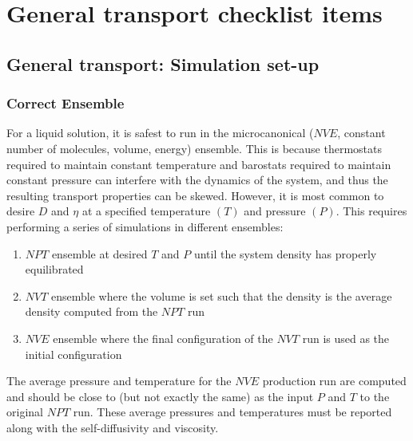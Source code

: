 \documentclass[9pt,bestpractices]{livecoms}
\begin{document}
\section{General transport checklist items} \label{sec:General}

\subsection{General transport: Simulation set-up} \label{sec:General Simulation Setup}

\subsubsection{Correct Ensemble} \label{sec:General: Correct Ensemble}

For a liquid solution, it is safest to run in the microcanonical ($NVE$, constant number of molecules, volume, energy) ensemble. This is because thermostats required to maintain constant temperature and barostats required to maintain constant pressure can interfere with the dynamics of the system, and thus the resulting transport properties can be skewed. However, it is most common to desire $D$ and $\eta$ at a specified temperature $(T)$ and pressure $(P)$. This requires performing a series of simulations in different ensembles:
\begin{enumerate}
	\item $NPT$ ensemble at desired $T$ and $P$ until the system density has properly equilibrated
	\item $NVT$ ensemble where the volume is set such that the density is the average density computed from the $NPT$ run
	\item $NVE$ ensemble where the final configuration of the $NVT$ run is used as the initial configuration
\end{enumerate}
The average pressure and temperature for the $NVE$ production run are computed and should be close to (but not exactly the same) as the input $P$ and $T$ to the original $NPT$ run. These average pressures and temperatures must be reported along with the self-diffusivity and viscosity.
\end{document}
